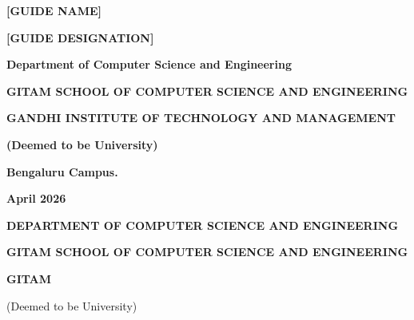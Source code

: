 \documentclass[12pt,letterpaper]{article}
\begin{document}
\begin{titlepage}
\begin{center}
{\fontsize{14}{17}\selectfont\textbf{[GUIDE NAME]}}

{\fontsize{14}{17}\selectfont\textbf{[GUIDE DESIGNATION]}}

\vspace{1.5cm}


\vspace{0.5cm}

{\fontsize{14}{17}\selectfont\textbf{Department of Computer Science and Engineering}}

{\fontsize{12}{14}\selectfont\textbf{GITAM SCHOOL OF COMPUTER SCIENCE AND ENGINEERING}}

{\fontsize{14}{17}\selectfont\textbf{GANDHI INSTITUTE OF TECHNOLOGY AND MANAGEMENT}}

{\fontsize{14}{17}\selectfont\textbf{(Deemed to be University)}}

{\fontsize{14}{17}\selectfont\textbf{Bengaluru Campus.}}

\vspace{0.5cm}

{\fontsize{14}{17}\selectfont\textbf{April 2026}}

\end{center}
\end{titlepage}

\newpage


\thispagestyle{fancy}

\begin{center}

\vspace*{1cm}


\vspace{0.5cm}

{\fontsize{14}{17}\selectfont\textbf{DEPARTMENT OF COMPUTER SCIENCE AND ENGINEERING}}

\vspace{0.3cm}

{\fontsize{13}{16}\selectfont\textbf{GITAM SCHOOL OF COMPUTER SCIENCE AND ENGINEERING}}

{\fontsize{14}{17}\selectfont\textbf{GITAM}}

{\normalfont (Deemed to be University)}

\vspace{0.5cm}

\end{center}
\end{document}
